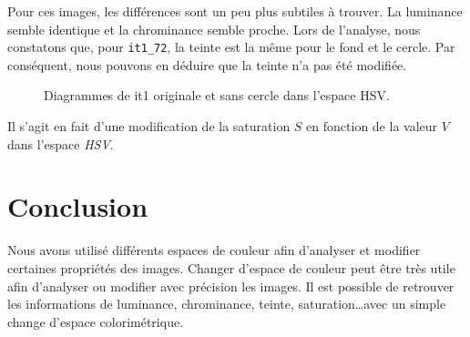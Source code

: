 \documentclass[a4paper,11pt]{article}
\begin{document}
Pour ces images, les différences sont un peu plus subtiles à trouver. 
La luminance semble identique et la chrominance semble proche. Lors 
de l'analyse, nous constatons que, pour \texttt{it1\_72}, la teinte est 
la même pour le fond et le cercle. Par conséquent, nous pouvons en 
déduire que la teinte n'a pas été modifiée.

\begin{figure}[H]
  \begin{center}  
    \caption{Diagrammes de it1 originale et sans cercle dans 
    l’espace HSV.}
  \end{center}
\end{figure}

Il s'agit en fait d'une modification de la saturation $S$ en fonction 
de la valeur $V$ dans l'espace \textit{HSV}.

\newpage

\section*{Conclusion}
Nous avons utilisé différents espaces de couleur afin d'analyser et 
modifier certaines propriétés des images. Changer d'espace de couleur 
peut être très utile afin d'analyser ou modifier avec précision 
les images. Il est possible de retrouver les informations 
de luminance, chrominance, teinte, saturation\ldots avec un simple 
change d'espace colorimétrique.  
\end{document}
